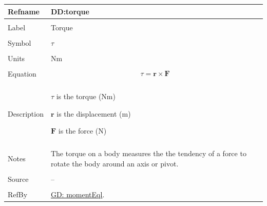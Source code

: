 \documentclass[12pt]{article}
\begin{document}
\noindent \begin{minipage}{\textwidth}
\begin{tabular}{p{} p{}}
\toprule \textbf{Refname} & \textbf{DD:torque}
\label{DD:torque}
\\ \midrule \\
Label & Torque
\\ \midrule \\
Symbol & $τ$
\\ \midrule \\
Units & Nm
\\ \midrule \\
Equation & \begin{displaymath}
           τ=\mathbf{r}\times\mathbf{F}
           \end{displaymath}
\\ \midrule \\
Description & \begin{symbDescription}
              \item{$τ$ is the torque (Nm)}
              \item{$\mathbf{r}$ is the displacement (m)}
              \item{$\mathbf{F}$ is the force (N)}
              \end{symbDescription}
\\ \midrule \\
Notes & The torque on a body measures the the tendency of a force to rotate the body around an axis or pivot.
\\ \midrule \\
Source & --
\\ \midrule \\
RefBy & \hyperref[GD:momentEql]{GD: momentEql}.
\\ \bottomrule \end{tabular}
\end{minipage}
\par~
\end{document}
